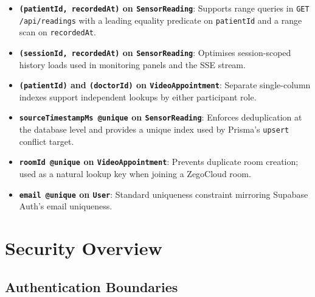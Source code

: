 \documentclass[12pt,a4paper]{report}
\begin{document}
\begin{itemize}[leftmargin=1.5em]
  \item \textbf{\texttt{(patientId, recordedAt)} on \texttt{SensorReading}}:
        Supports range queries in \texttt{GET /api/readings} with a
        leading equality predicate on \texttt{patientId} and a range
        scan on \texttt{recordedAt}.

  \item \textbf{\texttt{(sessionId, recordedAt)} on \texttt{SensorReading}}:
        Optimises session-scoped history loads used in monitoring panels
        and the SSE stream.

  \item \textbf{\texttt{(patientId)} and \texttt{(doctorId)} on \texttt{VideoAppointment}}:
        Separate single-column indexes support independent lookups by
        either participant role.

  \item \textbf{\texttt{sourceTimestampMs @unique} on \texttt{SensorReading}}:
        Enforces deduplication at the database level and provides a
        unique index used by Prisma's \texttt{upsert} conflict target.

  \item \textbf{\texttt{roomId @unique} on \texttt{VideoAppointment}}:
        Prevents duplicate room creation; used as a natural lookup key
        when joining a ZegoCloud room.

  \item \textbf{\texttt{email @unique} on \texttt{User}}:
        Standard uniqueness constraint mirroring Supabase Auth's email
        uniqueness.
\end{itemize}

\chapter{Security Overview}
\label{ch:security}

\section{Authentication Boundaries}
\end{document}
